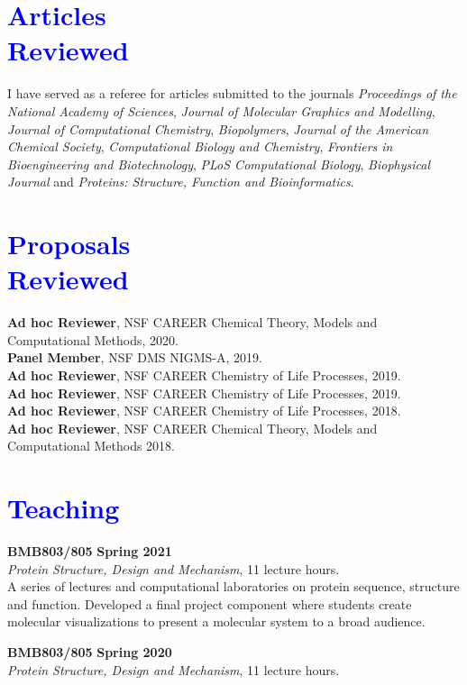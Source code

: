 \documentclass[margin,line]{res}
\begin{document}
\begin{resume}
\section{\sc \textcolor{blue}{ Articles \\ Reviewed}}
I have served as a referee for articles submitted to the journals \textit{Proceedings of the National Academy of Sciences}, \textit{Journal of Molecular Graphics and Modelling}, \textit{Journal of Computational Chemistry}, \textit{Biopolymers}, \textit{Journal of the American Chemical Society}, \textit{Computational Biology and Chemistry}, \textit{Frontiers in Bioengineering and Biotechnology}, \textit{PLoS Computational Biology}, \textit{Biophysical Journal} and \textit{Proteins: Structure, Function and Bioinformatics}.

\section{\sc \textcolor{blue}{ Proposals \\ Reviewed}}
        {\bf Ad hoc Reviewer}, NSF CAREER \hfill Chemical Theory, Models and Computational Methods, 2020. \\
        {\bf Panel Member}, NSF \hfill DMS NIGMS-A, 2019.\\
        {\bf Ad hoc Reviewer}, NSF CAREER \hfill Chemistry of Life Processes, 2019. \\
        {\bf Ad hoc Reviewer}, NSF CAREER \hfill Chemistry of Life Processes, 2019. \\
        {\bf Ad hoc Reviewer}, NSF CAREER \hfill Chemistry of Life Processes, 2018. \\
        {\bf Ad hoc Reviewer}, NSF CAREER \hfill Chemical Theory, Models and Computational Methods 2018. \\

\section{\sc \textcolor{blue}{ Teaching }}
{\bf BMB803/805} \hfill {\bf Spring 2021} \\
\emph{Protein Structure, Design and Mechanism}, 11 lecture hours.\\
A series of lectures and computational laboratories on protein sequence, structure and function.  Developed a final project component where students create molecular visualizations to present a molecular system to a broad audience.

{\bf BMB803/805} \hfill {\bf Spring 2020} \\
\emph{Protein Structure, Design and Mechanism}, 11 lecture hours.\\


\end{resume}
\end{document}
